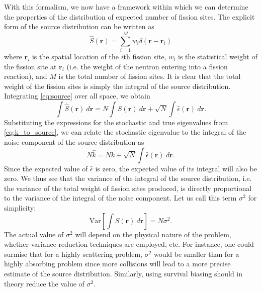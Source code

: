 With this formalism, we now have a framework within which we can determine the
properties of the distribution of expected number of fission sites. The explicit
form of the source distribution can be written as
\begin{equation}
  \hat{S}(\mathbf{r}) = \sum_{i=1}^{M} w_i \delta( \mathbf{r} - \mathbf{r}_i )
\end{equation}
where $\mathbf{r}_i$ is the spatial location of the $i$th fission site, $w_i$
is the statistical weight of the fission site at $\mathbf{r}_i$ (i.e. the weight
of the neutron entering into a fission reaction), and $M$ is the total number of
fission sites. It is clear that the total weight of the fission sites is simply
the integral of the source distribution. Integrating \eqref{eq:source} over all
space, we obtain
\begin{equation}
  \int \hat{S}(\mathbf{r}) \: d\mathbf{r} = N \int S(\mathbf{r}) \: d\mathbf{r}
  + \sqrt{N} \int \hat{\epsilon}(\mathbf{r}) \: d\mathbf{r} .
\end{equation}
Substituting the expressions for the stochastic and true eigenvalues from
\eqref{eq:k_to_source}, we can relate the stochastic eigenvalue to the integral
of the noise component of the source distribution as
\begin{equation}
  N\hat{k} = Nk + \sqrt{N} \int \hat{\epsilon}(\mathbf{r}) \: d\mathbf{r}.
\end{equation}
Since the expected value of $\hat{\epsilon}$ is zero, the expected value of its
integral will also be zero. We thus see that the variance of the integral of the
source distribution, i.e. the variance of the total weight of fission sites
produced, is directly proportional to the variance of the integral of the noise
component. Let us call this term $\sigma^2$ for simplicity:
\begin{equation}
  \text{Var} \left[ \int \hat{S}(\mathbf{r}) \: d\mathbf{r} \right ] = N
  \sigma^2.
\end{equation}
The actual value of $\sigma^2$ will depend on the physical nature of the
problem, whether variance reduction techniques are employed, etc. For instance,
one could surmise that for a highly scattering problem, $\sigma^2$ would be
smaller than for a highly absorbing problem since more collisions will lead to a
more precise estimate of the source distribution. Similarly, using survival
biasing should in theory reduce the value of $\sigma^2$.

